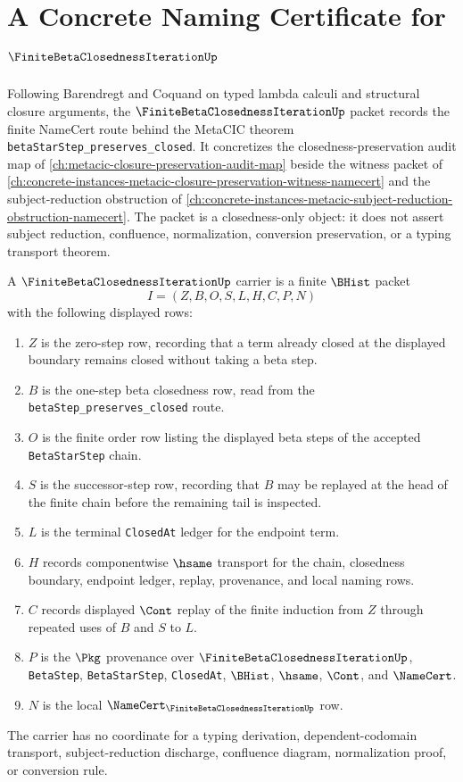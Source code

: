 \chapter{A Concrete Naming Certificate for $\FiniteBetaClosednessIterationUp$}
\label{ch:concrete-instances-finite-beta-closedness-iteration-namecert}

Following Barendregt and Coquand on typed lambda calculi and structural closure arguments, the $\FiniteBetaClosednessIterationUp$ packet records the finite NameCert route behind the MetaCIC theorem \texttt{betaStarStep\_preserves\_closed}. It concretizes the closedness-preservation audit map of \autoref{ch:metacic-closure-preservation-audit-map} beside the witness packet of \autoref{ch:concrete-instances-metacic-closure-preservation-witness-namecert} and the subject-reduction obstruction of \autoref{ch:concrete-instances-metacic-subject-reduction-obstruction-namecert}. The packet is a closedness-only object: it does not assert subject reduction, confluence, normalization, conversion preservation, or a typing transport theorem.

\begin{definition}
\label{def:finite-beta-closedness-iteration-carrier}
A $\FiniteBetaClosednessIterationUp$ carrier is a finite $\BHist$ packet
$$
I=(Z,B,O,S,L,H,C,P,N)
$$
with the following displayed rows:
\begin{enumerate}
\item $Z$ is the zero-step row, recording that a term already closed at the displayed boundary remains closed without taking a beta step.
\item $B$ is the one-step beta closedness row, read from the \texttt{betaStep\_preserves\_closed} route.
\item $O$ is the finite order row listing the displayed beta steps of the accepted \texttt{BetaStarStep} chain.
\item $S$ is the successor-step row, recording that $B$ may be replayed at the head of the finite chain before the remaining tail is inspected.
\item $L$ is the terminal \texttt{ClosedAt} ledger for the endpoint term.
\item $H$ records componentwise $\hsame$ transport for the chain, closedness boundary, endpoint ledger, replay, provenance, and local naming rows.
\item $C$ records displayed $\Cont$ replay of the finite induction from $Z$ through repeated uses of $B$ and $S$ to $L$.
\item $P$ is the $\Pkg$ provenance over $\FiniteBetaClosednessIterationUp$, \texttt{BetaStep}, \texttt{BetaStarStep}, \texttt{ClosedAt}, $\BHist$, $\hsame$, $\Cont$, and $\NameCert$.
\item $N$ is the local $\NameCert_{\FiniteBetaClosednessIterationUp}$ row.
\end{enumerate}
The carrier has no coordinate for a typing derivation, dependent-codomain transport, subject-reduction discharge, confluence diagram, normalization proof, or conversion rule.
\end{definition}

